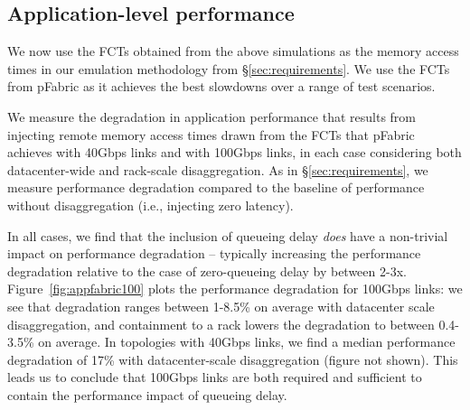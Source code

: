
\vspace{-0.1in}
\subsection{Application-level performance}
\label{ssec:alp}
\vspace{-0.05in}
We now use the FCTs obtained from the above simulations as the memory access times in our emulation methodology from \S\ref{sec:requirements}. We use the FCTs from pFabric as it achieves the best slowdowns over a range of test scenarios. 

We measure the degradation in application performance that results from injecting remote memory access times drawn from the FCTs that pFabric achieves with 40Gbps links and with 100Gbps links, in each case considering both datacenter-wide and rack-scale disaggregation. As in \S\ref{sec:requirements}, we measure performance degradation compared to the baseline of performance without disaggregation (i.e., injecting zero latency). 

In all cases, we find that the inclusion of queueing delay \emph{does} have a non-trivial impact on performance degradation -- typically increasing the performance degradation relative to the case of zero-queueing delay by between 2-3x. 
Figure~\ref{fig:appfabric100} plots the performance degradation for 100Gbps links: we see that degradation ranges between 1-8.5\% on average with datacenter scale disaggregation, and containment to a rack lowers the degradation to between 0.4-3.5\% on average. In topologies with 40Gbps links, we find a median performance degradation of 17\% with datacenter-scale disaggregation (figure not shown). 
This leads us to conclude that 100Gbps links are both required and sufficient to contain the performance impact of queueing delay.

